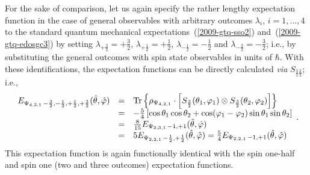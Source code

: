 \documentclass[pra,amsfonts,showpacs,showkeys,preprint]{revtex4}
\begin{document}
For the sake of comparison, let us again specify the rather lengthy
expectation function in the case of general observables with arbitrary outcomes $\lambda_i$, $i=1,\ldots ,4$
to the standard  quantum mechanical expectations~(\ref{2009-gtq-sso2})
and~(\ref{2009-gtq-edosgc3})
by setting $\lambda_{+\frac{3}{2}} = +\frac{3}{2}$,
$\lambda_{+\frac{1}{2}}= +\frac{1}{2}$,
$\lambda_{-\frac{1}{2}}=-\frac{1}{2}$ and
$\lambda_{-\frac{3}{2}}=-\frac{3}{2}$; i.e., by substituting the general outcomes with spin state observables in units of $\hbar$.
With these identifications, the expectation functions can be directly calculated {\it via} $S_{\frac{3}{2}\frac{3}{2}}$; i.e.,
\begin{equation}
\begin{array}{rcl}
E_{{ \Psi_{4,2,1}}\,-\frac{3}{2},-\frac{1}{2}, +\frac{1}{2}, +\frac{3}{2} } ({\hat \theta},{\hat \varphi} )
&=&
{\rm Tr}\left\{ \rho_{ \Psi_{4,2,1}} \cdot \left[ S_{\frac{3}{2}}(\theta_1,\varphi_1) \otimes S_{\frac{3}{2}}(\theta_2,\varphi_2)\right]\right\} \\
&=& -\frac{5}{4} \left[\cos \theta_1 \cos \theta_2 + \cos (\varphi_1 - \varphi_2) \sin \theta_1 \sin \theta_2\right] \\
&=& \frac{8}{15}E_{{ \Psi_{2,3,1}}\,-1, +1 } ({\hat \theta},{\hat \varphi} ) \\
&=& 5 E_{{ \Psi_{2,2,1}}\,-\frac{1}{2}, +\frac{1}{2} } ({\hat \theta},{\hat \varphi} )
= \frac{5}{4}E_{{ \Psi_{2,2,1}}\,-1, +1 } ({\hat \theta},{\hat \varphi} )
\end{array}
\label{2009-gtq-edosgc4}
.
\end{equation}
This expectation function is again functionally identical with the spin one-half and spin one (two and three outcomes) expectation functions.
\end{document}
